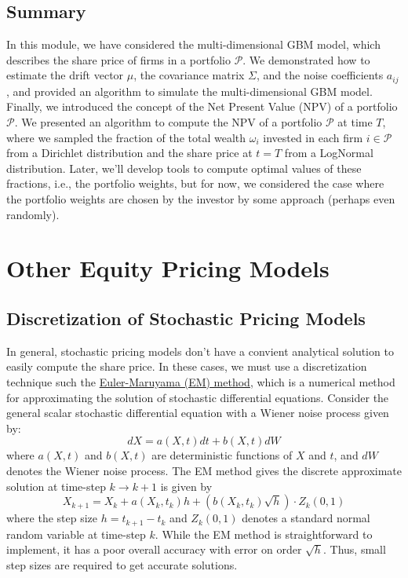 \documentclass[11pt]{article}
\theoremstyle{definition}
\begin{document}
\subsection{Summary}
In this module, we have considered the multi-dimensional GBM model, 
which describes the share price of firms in a portfolio $\mathcal{P}$.
We demonstrated how to estimate the drift vector $\mu$, the covariance matrix $\Sigma$, and the noise coefficients $a_{ij}$, and provided an algorithm to simulate the multi-dimensional GBM model. Finally, we introduced the concept of the Net Present Value (NPV) of a portfolio $\mathcal{P}$. We presented an algorithm to compute the NPV of a portfolio $\mathcal{P}$ at time $T$, 
where we sampled the fraction of the total wealth $\omega_{i}$ invested in each firm $i\in\mathcal{P}$ from a Dirichlet distribution and the share price at $t=T$ from a LogNormal distribution. Later, we'll develop tools to compute optimal values of these fractions, i.e., the portfolio weights, but for now, we considered the case where the portfolio weights are chosen by the investor by some approach (perhaps even randomly).

\section{Other Equity Pricing Models}

\subsection{Discretization of Stochastic Pricing Models}
In general, stochastic pricing models don't have a convient analytical solution to easily compute the share price. 
In these cases, we must use a discretization technique such the \href{https://en.wikipedia.org/wiki/Euler%E2%80%93Maruyama_method}{Euler-Maruyama (EM) method},
which is a numerical method for approximating the solution of stochastic differential equations. 
Consider the general scalar stochastic differential equation with a Wiener noise process given by:
\begin{equation}
dX = a(X,t)dt + b(X,t)dW
\end{equation}
where $a(X,t)$ and $b(X,t)$ are deterministic functions of $X$ and $t$, and $dW$ denotes the Wiener noise process.
The EM method gives the discrete approximate solution at time-step $k\rightarrow{k+1}$ is given by
\begin{equation}\label{eq-EM-method-general-case}
X_{k+1} = X_{k} + a(X_{k}, t_{k})h + \left(b(X_{k},t_{k})\sqrt{h}\right)\cdot{Z_{k}}\left(0,1\right)
\end{equation}
where the step size $h=t_{k+1} - t_{k}$ and $Z_{k}(0,1)$ denotes a standard normal random variable at time-step $k$.  
While the EM method is straightforward to implement, it has a poor overall accuracy with error on order $\sqrt{h}$. 
Thus, small step sizes are required to get accurate solutions.
\end{document}
